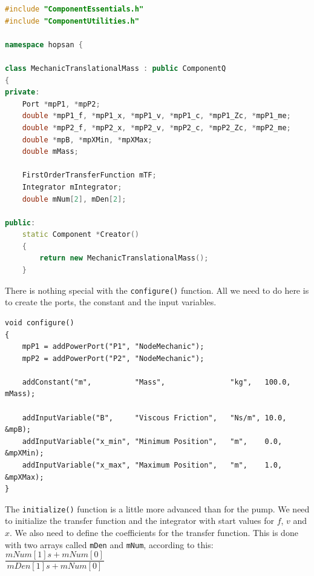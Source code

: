 \documentclass[a4paper,pdftex]{article}
\begin{document}
\noindent 
\begin{minipage}{\linewidth}
\begin{lstlisting}[language=c++, basicstyle=\footnotesize\ttfamily]
#include "ComponentEssentials.h"
#include "ComponentUtilities.h"

namespace hopsan {

class MechanicTranslationalMass : public ComponentQ
{
private:
    Port *mpP1, *mpP2;
    double *mpP1_f, *mpP1_x, *mpP1_v, *mpP1_c, *mpP1_Zc, *mpP1_me;
    double *mpP2_f, *mpP2_x, *mpP2_v, *mpP2_c, *mpP2_Zc, *mpP2_me;
    double *mpB, *mpXMin, *mpXMax;
    double mMass;

    FirstOrderTransferFunction mTF;
    Integrator mIntegrator;
    double mNum[2], mDen[2];

public:
    static Component *Creator()
    {
        return new MechanicTranslationalMass();
    }
\end{lstlisting}
\end{minipage}
 	
There is nothing special with the \texttt{configure()} function. All we need to do here is to create the ports, the constant and the input variables.

\noindent 
\begin{minipage}{\linewidth}
\begin{lstlisting}[basicstyle=\footnotesize\ttfamily]
void configure()
{
    mpP1 = addPowerPort("P1", "NodeMechanic");
    mpP2 = addPowerPort("P2", "NodeMechanic");

    addConstant("m",          "Mass",               "kg",   100.0, mMass);
    
    addInputVariable("B",     "Viscous Friction",   "Ns/m", 10.0,  &mpB);
    addInputVariable("x_min", "Minimum Position",   "m",    0.0,   &mpXMin);
    addInputVariable("x_max", "Maximum Position",   "m",    1.0,   &mpXMax);
}
\end{lstlisting}
\end{minipage}
 
The \texttt{initialize()} function is a little more advanced than for the pump. We need to initialize the transfer function and the integrator with start values for $f$, $v$ and $x$. We also need to define the coefficients for the transfer function. This is done with two arrays called \texttt{mDen} and \texttt{mNum}, according to this:\\

$\dfrac{mNum[1] s + mNum[0]}{mDen[1] s + mNum[0]}$\\
 
\end{document}

